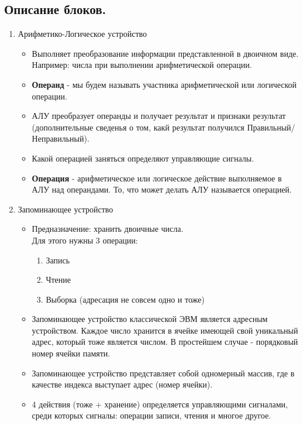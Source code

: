 \documentclass[12px]{article}
\begin{document}
\subsection{Описание блоков.}
\begin{enumerate}
    \item Арифметико-Логическое устройство
    \begin{itemize}
        \item Выполняет преобразование информации представленной в двоичном виде. Например: числа при выполнении арифметической операции. 
        \item \textbf{Операнд} - мы будем называть участника арифметической или логической операции. 
        \item АЛУ преобразует операнды и получает результат и признаки результат (дополнительные сведенья о том, какй результат получился Правильный/Неправильный).
        \item Какой операцией заняться определяют управляющие сигналы.
        \item \textbf{Операция} - арифметическое или логическое действие выполняемое в АЛУ над операндами. То, что может делать АЛУ называется операцией.
    \end{itemize}
    \item Запоминающее устройство
    \begin{itemize}
        \item Предназначение: хранить двоичные числа.\\
        Для этого нужны 3 операции:
        \begin{enumerate}
            \item Запись
            \item Чтение
            \item Выборка (адресация не совсем одно и тоже)
        \end{enumerate}
        \item Запоминающее устройство классической ЭВМ является адресным устройством. Каждое число хранится в ячейке имеющей свой уникальный адрес, который тоже является числом. В простейшем случае - порядковый номер ячейки памяти.
        \item Запоминающее устройство представляет собой одномерный массив, где в качестве индекса выступает адрес (номер ячейки).
        \item 4 действия (тоже + хранение) определяется управляющими сигналами, среди которых сигналы: операции записи, чтения и многое другое. 
    \end{itemize}

\end{enumerate}
\end{document}
